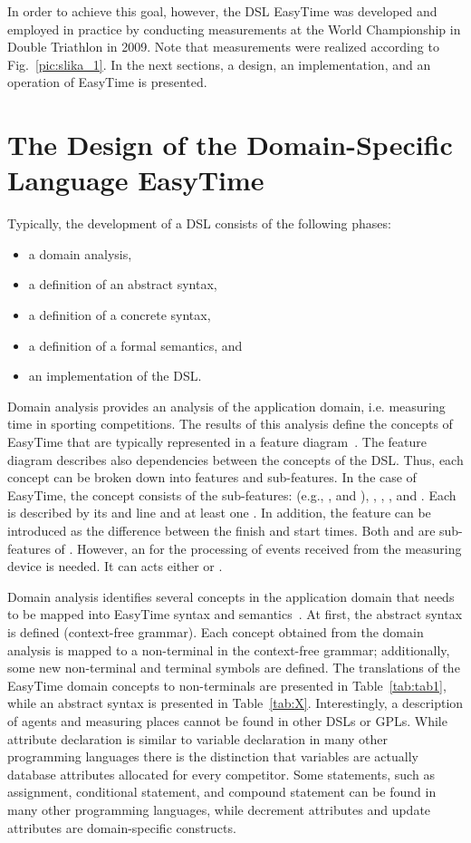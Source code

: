 \documentclass[preprint, prX]{revtex4}
\begin{document}
In order to achieve this goal, however, the DSL EasyTime was developed and employed in practice by conducting measurements at the World Championship in Double Triathlon in 2009. Note that measurements were realized according to Fig.~\ref{pic:slika_1}. In the next sections, a design, an implementation, and an operation of EasyTime is presented.



\section{The Design of the Domain-Specific Language EasyTime}

Typically, the development of a DSL consists of the following phases:
\begin{itemize}
  \item a domain analysis,
  \item a definition of an abstract syntax,
  \item a definition of a concrete syntax,
  \item a definition of a formal semantics, and
  \item an implementation of the DSL.
\end{itemize}
Domain analysis provides an analysis of the application domain, i.e. measuring time in sporting competitions. The results of this
analysis define the concepts of EasyTime that are typically represented in a feature diagram~\cite{Deursen:2002}. The feature diagram
describes also dependencies between the concepts of the DSL. Thus, each concept can be broken down into features and sub-features. In
the case of EasyTime, the concept  consists of the sub-features:  (e.g., ,  and ), , , , and . Each  is described by its  and  line and at least one . In addition, the feature  can be introduced as the difference between the finish and start times. Both  and  are sub-features of . However, an  for the processing of events received from the measuring device is needed. It can acts either  or .

Domain analysis identifies several concepts in the application domain that needs to be mapped into EasyTime syntax and
semantics~\cite{Mernik:2005}. At first, the abstract syntax is defined (context-free grammar). Each concept obtained from the domain
analysis is mapped to a non-terminal in the context-free grammar; additionally, some new non-terminal and terminal symbols are defined. The translations of the EasyTime domain concepts to non-terminals are presented in Table~\ref{tab:tab1}, while an abstract syntax is presented in Table~\ref{tab:X}. Interestingly, a description of agents and measuring places cannot be found in other DSLs or GPLs. While attribute declaration is similar to variable declaration in many other programming languages there is the distinction that variables are actually database attributes allocated for every competitor. Some statements, such as assignment, conditional statement, and compound statement can be found in many other programming languages, while decrement attributes and update attributes are domain-specific constructs.
\end{document}
